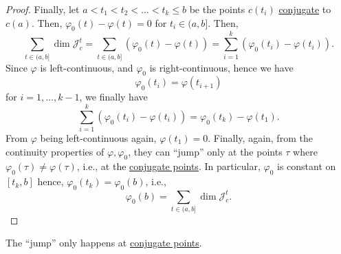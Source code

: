 \begin{proof}
	Finally, let \(a < t_1 < t_2 < \ldots < t_k \leq b\) be the points \(c(t_i)\) \hyperref[def:conjugate-point]{conjugate} to \(c(a)\). Then, \(\varphi _0(t) - \varphi (t) = 0\) for \(t_i\in (a, b]\). Then,
	\[
		\sum_{t\in (a, b]} \dim \mathcal{J} _c^t
		= \sum_{t\in (a, b]} (\varphi _0(t) - \varphi (t))
		= \sum_{i=1}^k (\varphi _0 (t_i) - \varphi (t_i)).
	\]
	Since \(\varphi \) is left-continuous, and \(\varphi _0\) is right-continuous, hence we have
	\[
		\varphi _0(t_i) = \varphi (t_{i+1})
	\]
	for \(i = 1, \ldots , k-1\), we finally have
	\[
		\sum_{i=1}^k \left( \varphi _0(t_i) - \varphi (t_i) \right) = \varphi _0(t_k) - \varphi (t_1).
	\]
	From \(\varphi \) being left-continuous again, \(\varphi (t_1) = 0\). Finally, again, from the continuity properties of \(\varphi , \varphi _0\), they can ``jump'' only at the points \(\tau \) where \(\varphi _0(\tau ) \neq \varphi (\tau )\), i.e., at the \hyperref[def:conjugate-point]{conjugate points}. In particular, \(\varphi _0\) is constant on \([t_k, b]\) hence, \(\varphi _0(t_k) = \varphi _0(b)\), i.e.,
	\[
		\varphi _0(b) = \sum_{t\in (a, b]} \dim \mathcal{J} _c^t.
	\]
\end{proof}

\begin{intuition}
	The ``jump'' only happens at \hyperref[def:conjugate-point]{conjugate points}.
\end{intuition}
